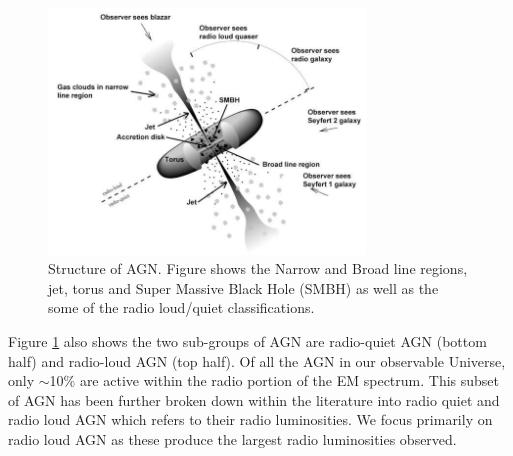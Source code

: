 \documentclass[10pt,a4paper]{article}
\begin{document}
\begin{figure}[H]
\begin{center}
	\includegraphics[width=0.75\textwidth]{SMBH}
	\caption{Structure of AGN. Figure shows the Narrow and Broad line regions, jet, torus and Super Massive Black Hole (SMBH) as well as the some of the radio loud/quiet classifications\footnotemark.}
	\label{agnstruc}
\end{center}
\end{figure}
Figure \ref{agnstruc} also shows the two sub-groups of AGN are radio-quiet AGN (bottom half) and radio-loud AGN (top half). Of all the AGN in our observable Universe, only $\sim$10\% are active within the radio portion of the EM spectrum. This subset of AGN has been further broken down within the literature into radio quiet and radio loud AGN which refers to their radio luminosities. We focus primarily on radio loud AGN as these produce the largest radio luminosities observed.
\end{document}
